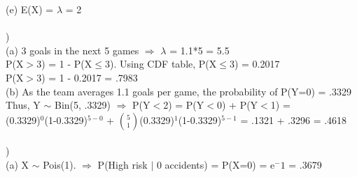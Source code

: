 \documentclass[12pt]{article}
\begin{document}
\indent (e) E(X) = $\lambda$ = 2\\


\noindent \hrulefill \\


)\\
\indent (a) 3 goals in the next 5 games $\Rightarrow$ $\lambda$ = 1.1*5 = 5.5\\
\indent \indent P(X$>$3) = 1 - P(X$\le$3). \indent\indent\indent Using CDF table, P(X$\le$3) = 0.2017\\ 
\indent \indent P(X$>$3) = 1 - 0.2017 = .7983\\

\indent (b) As the team averages 1.1 goals per game, the probability of P(Y=0) = .3329\\
\indent \indent Thus, Y $\sim$ Bin(5, .3329) $\Rightarrow$ P(Y$<$2) = P(Y$<$0) + P(Y$<$1) = \\[.4em]
\indent {}(0.3329)$^{0}$(1-0.3329)$^{5-0}$ + {\Large$\binom{5}{1}$}(0.3329)$^{1}$(1-0.3329)$^{5-1}$ = .1321 + .3296 = .4618\\


\noindent \hrulefill \\


)\\
\indent \indent (a) X $\sim$ Pois(1).  $\Rightarrow$ P(High risk $|$ 0 accidents) = P(X=0) = e$^-1$ = .3679\\
\end{document}
